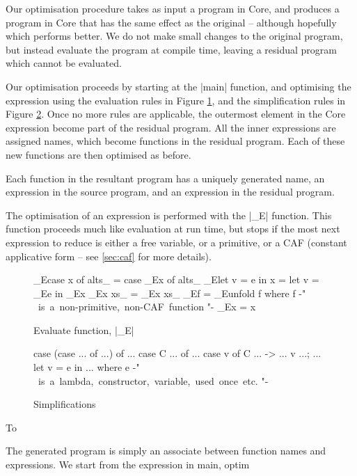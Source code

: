\documentclass{llncs}
\begin{document}
Our optimisation procedure takes as input a program in Core, and produces a program in Core that has the same effect as the original -- although hopefully which performs better. We do not make small changes to the original program, but instead evaluate the program at compile time, leaving a residual program which cannot be evaluated.

Our optimisation proceeds by starting at the |main| function, and optimising the expression using the evaluation rules in Figure \ref{fig:evaluate}, and the simplification rules in Figure \ref{fig:simplify}. Once no more rules are applicable, the outermost element in the Core expression become part of the residual program. All the inner expressions are assigned names, which become functions in the residual program. Each of these new functions are then optimised as before.

Each function in the resultant program has a uniquely generated name, an expression in the source program, and an expression in the residual program.

The optimisation of an expression is performed with the |_E| function. This function proceeds much like evaluation at run time, but stops if the most next expression to reduce is either a free variable, or a primitive, or a CAF (constant applicative form -- see \ref{sec:caf} for more details).


\begin{figure}[tb]
\begin{code}
_E\<case x of alts_  \> =  case _E\<x\> of alts_
_E\<let v = e in x   \> =  let v = _E\<e\> in _E\<x\>
_E\<x xs_            \> =  _E\<x\> xs_
_E\<f                \> =  _E\<unfold f\>
                           where f {-" \hbox{ is a non-primitive, non-CAF function} "-}
_E\<x                \> =  x
\end{code}
\caption{Evaluate function, |_E|}
\label{fig:evaluate}
\end{figure}

\begin{figure}[tb]
\begin{code}
case (case ... of ...) of ...
case C ... of ...
case v of {C ... -> ... v ...; ...}
let v = e in ... where e {-" \hbox{ is a lambda, constructor, variable, used once etc.} "-}
\end{code}
\caption{Simplifications}
\label{fig:simplify}
\end{figure}

To 


The generated program is simply an associate between function names and expressions. We start from the expression in main, optim
\end{document}
